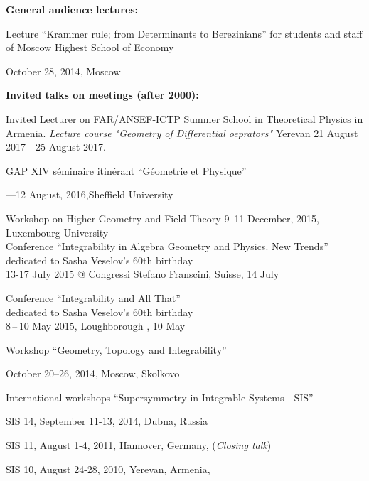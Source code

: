 \documentclass[12pt]{article}
\newcommand{\punkt}{\par\medskip\noindent}
\def\m {\medskip}
\begin{document}
 \punkt
 {\bf General audience lectures:}

Lecture ``Krammer rule; from Determinants to Berezinians'' for students
  and staff of Moscow Highest School of Economy

         October 28, 2014, Moscow 






 \punkt
 {\bf Invited talks on meetings (after 2000):}

\noindent Invited Lecturer on 
FAR/ANSEF-ICTP  Summer School in 
Theoretical Physics in Armenia. 
{\it Lecture course
  "Geometry of Differential oeprators"}
Yerevan  21 August 2017---25 August 2017.

\m

\noindent GAP XIV s\'eminaire itin\'erant 
``G\'eometrie et Physique''

---12 August, 2016,Sheffield University

\m

\noindent Workshop on Higher Geometry and Field Theory
             9--11 December, 2015, Luxembourg University\\


\noindent Conference ``Integrability in Algebra Geometry and 
        Physics. New Trends''\\
  dedicated to  Sasha Veselov's 60th birthday\\
 13-17 July 2015 @ Congressi Stefano Franscini, Suisse, 14 July

\m

\noindent Conference ``Integrability and All That''\\
 dedicated to  Sasha Veselov's 60th birthday\\
8\,--\,10   May 2015, Loughborough , 10 May


\m



\noindent Workshop ``Geometry, Topology and Integrability''
    
  October  20--26, 2014, Moscow, Skolkovo 


\noindent International workshops 
 ``Supersymmetry in Integrable Systems - SIS'' 

 SIS 14, September 11-13, 2014, Dubna, Russia
 

 SIS 11, August 1-4, 2011,  Hannover, Germany, ({\it Closing talk}) 

 
 SIS 10, August 24-28, 2010, Yerevan, Armenia, 

\m
\end{document}
